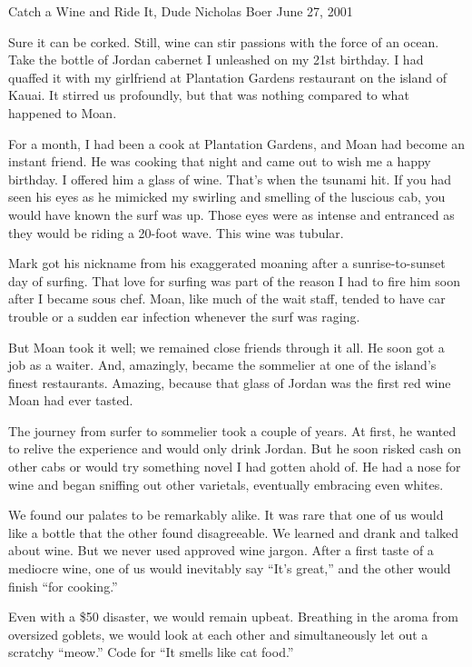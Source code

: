 \documentclass[12pt]{article}
\begin{document}
\noindent
Catch a Wine and Ride It, Dude\newline
Nicholas Boer\newline
June 27, 2001

\bigskip
\noindent
Sure it can be corked. Still, wine can stir passions with the force of an ocean. Take the bottle of Jordan cabernet I unleashed on my 21st birthday. I had quaffed it with my girlfriend at Plantation Gardens restaurant on the island of Kauai. It stirred us profoundly, but that was nothing compared to what happened to Moan.

\bigskip
\noindent
For a month, I had been a cook at Plantation Gardens, and Moan had become an instant friend. He was cooking that night and came out to wish me a happy birthday. I offered him a glass of wine. That's when the tsunami hit. If you had seen his eyes as he mimicked my swirling and smelling of the luscious cab, you would have known the surf was up. Those eyes were as intense and entranced as they would be riding a 20-foot wave. This wine was tubular.

\bigskip
\noindent
Mark got his nickname from his exaggerated moaning after a sunrise-to-sunset day of surfing. That love for surfing was part of the reason I had to fire him soon after I became sous chef. Moan, like much of the wait staff, tended to have car trouble or a sudden ear infection whenever the surf was raging.

\bigskip
\noindent
But Moan took it well; we remained close friends through it all. He soon got a job as a waiter. And, amazingly, became the sommelier at one of the island's finest restaurants. Amazing, because that glass of Jordan was the first red wine Moan had ever tasted.

\bigskip
\noindent
The journey from surfer to sommelier took a couple of years. At first, he wanted to relive the experience and would only drink Jordan. But he soon risked cash on other cabs or would try something novel I had gotten ahold of. He had a nose for wine and began sniffing out other varietals, eventually embracing even whites.

\bigskip
\noindent
We found our palates to be remarkably alike. It was rare that one of us would like a bottle that the other found disagreeable. We learned and drank and talked about wine. But we never used approved wine jargon. After a first taste of a mediocre wine, one of us would inevitably say ``It's great,'' and the other would finish ``for cooking.''

\bigskip
\noindent
Even with a \$50 disaster, we would remain upbeat. Breathing in the aroma from oversized goblets, we would look at each other and simultaneously let out a scratchy ``meow.'' Code for ``It smells like cat food.''
\end{document}
